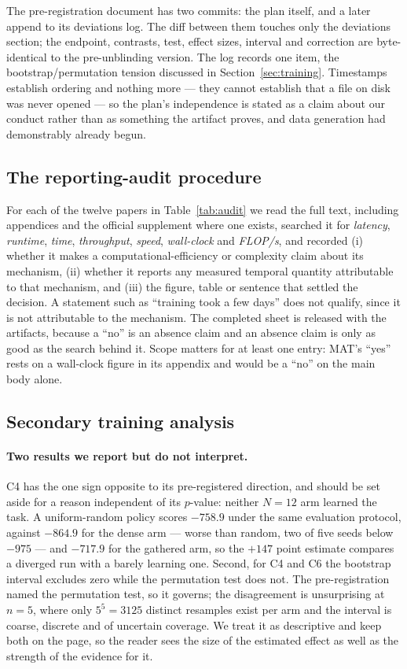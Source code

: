 The pre-registration document has two commits: the plan itself, and a later
append to its deviations log. The diff between them touches only the deviations
section; the endpoint, contrasts, test, effect sizes, interval and correction
are byte-identical to the pre-unblinding version. The log records one item, the
bootstrap/permutation tension discussed in Section~\ref{sec:training}.
Timestamps establish ordering and nothing more --- they cannot establish that a
file on disk was never opened --- so the plan's independence is stated as a
claim about our conduct rather than as something the artifact proves, and data
generation had demonstrably already begun.

\subsection{The reporting-audit procedure}
\label{app:audit}

For each of the twelve papers in Table~\ref{tab:audit} we read the full text,
including appendices and the official supplement where one exists, searched it
for \emph{latency}, \emph{runtime}, \emph{time}, \emph{throughput},
\emph{speed}, \emph{wall-clock} and \emph{FLOP/s}, and recorded (i) whether it
makes a computational-efficiency or complexity claim about its mechanism, (ii)
whether it reports any measured temporal quantity attributable to that
mechanism, and (iii) the figure, table or sentence that settled the decision. A
statement such as ``training took a few days'' does not qualify, since it is
not attributable to the mechanism. The completed sheet is released with the
artifacts, because a ``no'' is an absence claim and an absence claim is only as
good as the search behind it. Scope matters for at least one entry: MAT's
``yes'' rests on a wall-clock figure in its appendix and would be a ``no'' on
the main body alone.

\subsection{Secondary training analysis}
\label{app:training}

\paragraph{Two results we report but do not interpret.} C4 has the one sign
opposite to its pre-registered direction, and should be set aside for a reason
independent of its $p$-value: neither $N{=}12$ arm learned the task. A
uniform-random policy scores $-758.9$ under the same evaluation protocol,
against $-864.9$ for the dense arm --- worse than random, two of five seeds
below $-975$ --- and $-717.9$ for the gathered arm, so the $+147$ point estimate
compares a diverged run with a barely learning one. Second, for C4 and C6 the
bootstrap interval excludes zero while the permutation test does not. The
pre-registration named the permutation test, so it governs; the disagreement is
unsurprising at $n{=}5$, where only $5^5 = 3125$ distinct resamples exist per
arm and the interval is coarse, discrete and of uncertain coverage. We treat it
as descriptive and keep both on the page, so the reader sees the size of the
estimated effect as well as the strength of the evidence for it.

